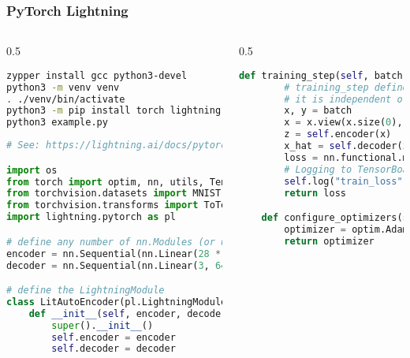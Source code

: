 \documentclass[
	notes=none,
	aspectratio=169
]{beamer}
\begin{document}
\begin{frame}[fragile]
\frametitle{PyTorch Lightning}

\begin{columns}[T]
\begin{column}[T]{0.5\textwidth}
\setlength{\parskip}{0.5em}

\vspace{0.6cm}
\begin{lstlisting}[language=sh]
zypper install gcc python3-devel
python3 -m venv venv
. ./venv/bin/activate
python3 -m pip install torch lightning torchvision
python3 example.py
\end{lstlisting}

\vspace{0.2cm}
\begin{lstlisting}[language=python]
# See: https://lightning.ai/docs/pytorch/stable/starter/introduction.html

import os
from torch import optim, nn, utils, Tensor
from torchvision.datasets import MNIST
from torchvision.transforms import ToTensor
import lightning.pytorch as pl

# define any number of nn.Modules (or use your current ones)
encoder = nn.Sequential(nn.Linear(28 * 28, 64), nn.ReLU(), nn.Linear(64, 3))
decoder = nn.Sequential(nn.Linear(3, 64), nn.ReLU(), nn.Linear(64, 28 * 28))

# define the LightningModule
class LitAutoEncoder(pl.LightningModule):
    def __init__(self, encoder, decoder):
        super().__init__()
        self.encoder = encoder
        self.decoder = decoder
\end{lstlisting}

\end{column}
\begin{column}[T]{0.5\textwidth}
\setlength{\parskip}{0.5em}

\vspace{0.6cm}
\begin{lstlisting}[language=python,firstnumber=20]
    def training_step(self, batch, batch_idx):
        # training_step defines the train loop.
        # it is independent of forward
        x, y = batch
        x = x.view(x.size(0), -1)
        z = self.encoder(x)
        x_hat = self.decoder(z)
        loss = nn.functional.mse_loss(x_hat, x)
        # Logging to TensorBoard (if installed) by default
        self.log("train_loss", loss)
        return loss

    def configure_optimizers(self):
        optimizer = optim.Adam(self.parameters(), lr=1e-3)
        return optimizer


\end{lstlisting}
\end{column}
\end{columns}
\end{frame}
\end{document}
